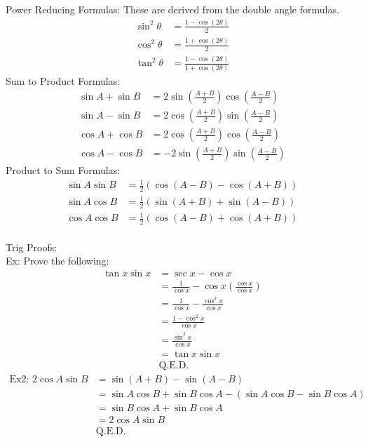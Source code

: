 \documentclass[11pt, fleqn]{article}
\begin{document}
Power Reducing Formulas:
These are derived from the double angle formulas.
\begin{align*}
    \sin^2\theta&=\frac{1-\cos(2\theta)}{2}\\
    \cos^2\theta&=\frac{1+\cos(2\theta)}{2}\\
    \tan^2\theta&=\frac{1-\cos(2\theta)}{1+\cos(2\theta)}
\end{align*}
Sum to Product Formulas:
\begin{align*}
    \sin A+\sin B&=2\sin\left(\frac{A+B}{2}\right)\cos\left(\frac{A-B}{2}\right)\\
    \sin A-\sin B&=2\cos\left(\frac{A+B}{2}\right)\sin\left(\frac{A-B}{2}\right)\\
    \cos A+\cos B&=2\cos\left(\frac{A+B}{2}\right)\cos\left(\frac{A-B}{2}\right)\\
    \cos A-\cos B&=-2\sin\left(\frac{A+B}{2}\right)\sin\left(\frac{A-B}{2}\right)
\end{align*}
Product to Sum Formulas:
\begin{align*}
    \sin A\sin B&=\frac{1}{2}(\cos(A-B)-\cos(A+B))\\
    \sin A\cos B&=\frac{1}{2}(\sin(A+B)+\sin(A-B))\\
    \cos A\cos B&=\frac{1}{2}(\cos(A-B)+\cos(A+B))
\end{align*}
\\
Trig Proofs:\\
Ex: Prove the following:
\begin{align*}
    \tan x\sin x&=\sec x-\cos x\\
    &=\frac{1}{\cos x}-\cos x\left(\frac{\cos x}{\cos x}\right)\\
    &=\frac{1}{\cos x}-\frac{\cos^2x}{\cos x}\\
    &=\frac{1-\cos^2x}{\cos x}\\
    &=\frac{\sin^2x}{\cos x}\\
    &=\tan x\sin x\\
    &\text{Q.E.D.}
\end{align*}
\begin{align*}
    \text{Ex2: }2\cos A\sin B&=\sin(A+B)-\sin(A-B)\\
    &=\sin A\cos B+\sin B\cos A-(\sin A\cos B-\sin B\cos A)\\
    &=\sin B\cos A+\sin B\cos A\\
    &=2\cos A\sin B\\
    &\text{Q.E.D.}
\end{align*}
\end{document}
